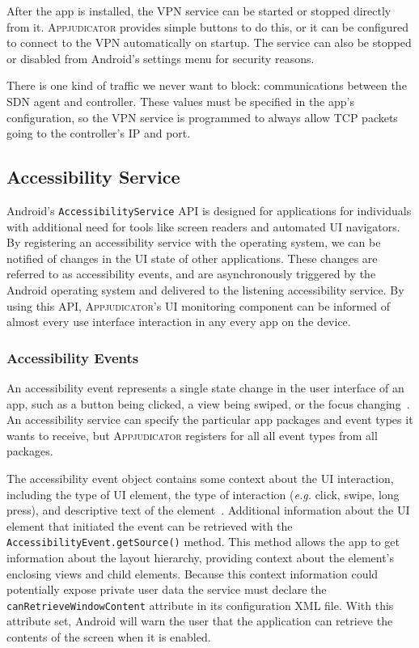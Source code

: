 After the app is installed, the VPN service can be started or stopped directly
from it. \textsc{Appjudicator} provides simple buttons to do this, or it can be
configured to connect to the VPN automatically on startup. The service can also
be stopped or disabled from Android's settings menu for security reasons.

There is one kind of traffic we never want to block: communications between the
SDN agent and controller. These values must be specified in the app's
configuration, so the VPN service is programmed to always allow TCP packets
going to the controller's IP and port.

\subsection{Accessibility Service}
\label{sec:implementation-accessibility-service}

Android's \texttt{AccessibilityService} API is designed for applications for
individuals with additional need for tools like screen readers and automated UI
navigators. By registering an accessibility service with the operating system,
we can be notified of changes in the UI state of other applications. These
changes are referred to as accessibility events, and are asynchronously
triggered by the Android operating system and delivered to the listening
accessibility service. By using this API, \textsc{Appjudicator}'s UI monitoring
component can be informed of almost every use interface interaction in any every
app on the device.


\subsubsection{Accessibility Events}
\label{sec:accessibility-events}

An accessibility event represents a single state change in the user interface of
an app, such as a button being clicked, a view being swiped, or the focus
changing~\cite{accessibilityserviceguide}. An accessibility service can specify
the particular app packages and event types it wants to receive, but
\textsc{Appjudicator} registers for all all event types from all packages.

The accessibility event object contains some context about the UI interaction,
including the type of UI element, the type of interaction (\textit{e.g.} click,
swipe, long press), and descriptive text of the
element~\cite{accessibilityserviceguide}. Additional information about the UI
element that initiated the event can be retrieved with the
\texttt{AccessibilityEvent.getSource()} method. This method allows the app to
get information about the layout hierarchy, providing context about the
element's enclosing views and child elements. Because this context information
could potentially expose private user data the service must declare the
\texttt{canRetrieveWindowContent} attribute in its configuration XML file. With
this attribute set, Android will warn the user that the application can retrieve
the contents of the screen when it is enabled.

